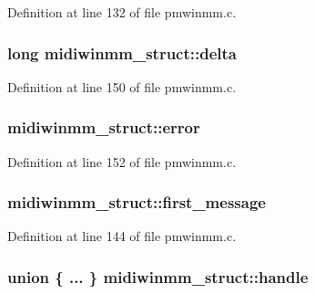 Definition at line 132 of file pmwinmm.\+c.

\subsubsection[{\texorpdfstring{delta}{delta}}]{\setlength{\rightskip}{0pt plus 5cm}long midiwinmm\+\_\+struct\+::delta}\hypertarget{structmidiwinmm__struct_a60acc42e195cf76af089519c6e573d72}{}\label{structmidiwinmm__struct_a60acc42e195cf76af089519c6e573d72}


Definition at line 150 of file pmwinmm.\+c.

\subsubsection[{\texorpdfstring{error}{error}}]{ midiwinmm\+\_\+struct\+::error}\hypertarget{structmidiwinmm__struct_a3eed174837c7451870164d583b642d01}{}\label{structmidiwinmm__struct_a3eed174837c7451870164d583b642d01}


Definition at line 152 of file pmwinmm.\+c.

\subsubsection[{\texorpdfstring{first\+\_\+message}{first_message}}]{ midiwinmm\+\_\+struct\+::first\+\_\+message}\hypertarget{structmidiwinmm__struct_ac9a589032892c74beeab0b6a998c13eb}{}\label{structmidiwinmm__struct_ac9a589032892c74beeab0b6a998c13eb}


Definition at line 144 of file pmwinmm.\+c.

\subsubsection[{\texorpdfstring{handle}{handle}}]{\setlength{\rightskip}{0pt plus 5cm}union \{ ... \}   midiwinmm\+\_\+struct\+::handle}\hypertarget{structmidiwinmm__struct_ac29e7bd52dc024589554d4af99a7d08e}{}\label{structmidiwinmm__struct_ac29e7bd52dc024589554d4af99a7d08e}
